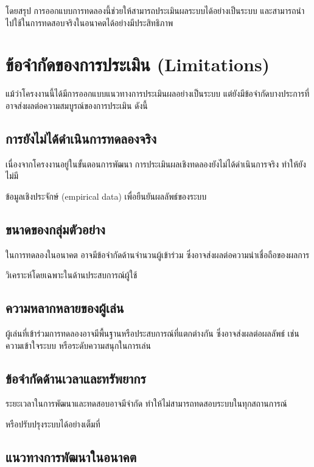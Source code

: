 โดยสรุป การออกแบบการทดลองนี้ช่วยให้สามารถประเมินผลระบบได้อย่างเป็นระบบ และสามารถนำไปใช้ในการทดสอบจริงในอนาคตได้อย่างมีประสิทธิภาพ


\section{ข้อจำกัดของการประเมิน (Limitations)}

แม้ว่าโครงงานนี้ได้มีการออกแบบแนวทางการประเมินผลอย่างเป็นระบบ แต่ยังมีข้อจำกัดบางประการที่อาจส่งผลต่อความสมบูรณ์ของการประเมิน ดังนี้

\subsection{การยังไม่ได้ดำเนินการทดลองจริง}

เนื่องจากโครงงานอยู่ในขั้นตอนการพัฒนา การประเมินผลเชิงทดลองยังไม่ได้ดำเนินการจริง ทำให้ยังไม่มี
\par\vspace{0.5em}\noindent
ข้อมูลเชิงประจักษ์ (empirical data) เพื่อยืนยันผลลัพธ์ของระบบ

\subsection{ขนาดของกลุ่มตัวอย่าง}

ในการทดลองในอนาคต อาจมีข้อจำกัดด้านจำนวนผู้เข้าร่วม ซึ่งอาจส่งผลต่อความน่าเชื่อถือของผลการ 
\par\vspace{0.5em}\noindent
วิเคราะห์โดยเฉพาะในด้านประสบการณ์ผู้ใช้

\subsection{ความหลากหลายของผู้เล่น}

ผู้เล่นที่เข้าร่วมการทดลองอาจมีพื้นฐานหรือประสบการณ์ที่แตกต่างกัน ซึ่งอาจส่งผลต่อผลลัพธ์ เช่น ความเข้าใจระบบ หรือระดับความสนุกในการเล่น

\subsection{ข้อจำกัดด้านเวลาและทรัพยากร}

ระยะเวลาในการพัฒนาและทดสอบอาจมีจำกัด ทำให้ไม่สามารถทดสอบระบบในทุกสถานการณ์
\par\vspace{0.5em}\noindent
หรือปรับปรุงระบบได้อย่างเต็มที่

\subsection{แนวทางการพัฒนาในอนาคต}

